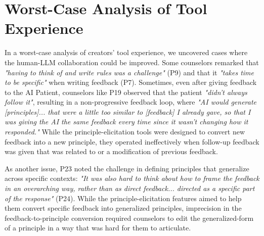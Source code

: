 \documentclass[11pt]{article}
\begin{document}
\begin{table}[!h]
    \centering
    \caption{Four measures as part of the tool usage section of the questionnaire taken from ~\cite{petridis2023constitutionmaker}}
    \label{tab:measures-tooluse}
\end{table}
% 
% 
% 

\section{Worst-Case Analysis of Tool Experience} \label{sec:worst-case-tool-experience}
In a worst-case analysis of creators' tool experience, we uncovered cases where the human-LLM collaboration could be improved. Some counselors remarked that \textit{"having to think of and write rules was a challenge"} (P9) and that it \textit{"takes time to be specific"} when writing feedback (P7). Sometimes, even after giving feedback to the AI Patient, counselors like P19 observed that the patient \textit{"didn't always follow it"}, resulting in a non-progressive feedback loop, where \textit{"AI would generate [principles]... that were a little too similar to [feedback] I already gave, so that I was giving the AI the same feedback every time since it wasn't changing how it responded."}  While the principle-elicitation tools were designed to convert new feedback into a new principle, they operated ineffectively when follow-up feedback was given that was related to or a modification of previous feedback.  

As another issue, P23 noted the challenge in defining principles that generalize across specific contexts: \textit{"It was also hard to think about how to frame the feedback in an overarching way, rather than as direct feedback... directed as a specific part of the response"} (P24). While the principle-elicitation features aimed to help them convert specific feedback into generalized principles, imprecision in the feedback-to-principle conversion required counselors to edit the generalized-form of a principle in a way that was hard for them to articulate. 
\end{document}
